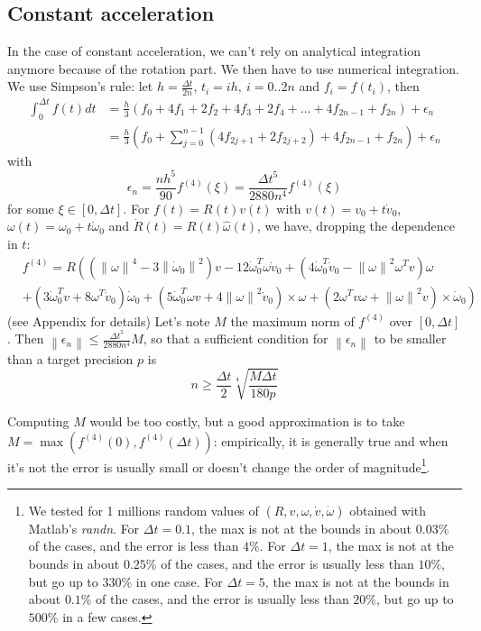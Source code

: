 \documentclass[]{article}
\newcommand{\norm}[1]{\left\| #1 \right\|}
\newcommand{\dt}{\Delta t}
\newcommand{\w}{\omega}
\newcommand{\dw}{\dot{\omega}}
\newcommand{\dv}{\dot{v}}
\begin{document}
\subsection{Constant acceleration}
In the case of constant acceleration, we can't rely on analytical integration anymore because of the rotation part. We then have to use numerical integration. We use Simpson's rule: let $h = \frac{\dt}{2n}$, $t_i = ih,\ i=0..2n$ and $f_i = f(t_i)$, then
\begin{align}
	\int_0^{\dt} f(t) dt &= \frac{h}{3}\left(f_0 + 4 f_1 + 2f_2 + 4 f_3 + 2 f_4 + \ldots + 4f_{2n-1} + f_{2n}\right) + \epsilon_n \\
	& = \frac{h}{3} \left(f_0 + \sum_{j=0}^{n-1} (4 f_{2j+1} + 2 f_{2j+2}) + 4f_{2n-1} + f_{2n}\right) + \epsilon_n
\end{align}
with
\begin{equation}
	\epsilon_n = \frac{nh^5}{90}f^{(4)}(\xi) = \frac{\dt^5}{2880n^4}f^{(4)}(\xi)
\end{equation}
for some $\xi \in \left[0,\dt\right]$.
\newline
For $f(t) = R(t)v(t)$ with $v(t) = v_0 + t \dv_0$, $\w(t) = \w_0 + t \dw_0$ and $\dot{R}(t) = R(t)\hat{\w}(t)$, we have, dropping the dependence in $t$:
\begin{align}
	&f^{(4)} = R \left((\norm{\w}^4-3\norm{\dw_0}^2)v -12\dw_0^T \w \dv_0 + (4\dw_0^T \dv_0 - \norm{\w}^2\w^T v)\w\right. \nonumber\\ 
	& \left. + (3\dw_0^T v + 8\w^T \dv_0)\dw_0+(5\dw_0^T \w v + 4\norm{\w}^2 \dv_0) \times \w + (2 \w^T v\w + \norm{\w}^2 v) \times \dw_0\right)\nonumber
\end{align}
(see Appendix for details)
\newline
Let's note $M$ the maximum norm of $f^{(4)}$ over $\left[0,\dt\right]$. Then $\norm{\epsilon_n} \leq \frac{\dt^5}{2880n^4}M$, so that a sufficient condition for $\norm{\epsilon_n}$ to be smaller than a target precision $p$ is
\begin{equation}
  n \geq \frac{\dt}{2} \sqrt[4]{\frac{M\dt}{180p}}
\end{equation}

Computing $M$ would be too costly, but a good approximation is to take $M = \max(f^{(4)}(0),f^{(4)}(\dt))$: empirically, it is generally true and when it's not the error is usually small or doesn't change the order of magnitude\footnote{We tested for 1 millions random values of $(R,v,\w,\dv,\dw)$ obtained with Matlab's \emph{randn}. For $\dt=0.1$, the max is not at the bounds in about $0.03\%$ of the cases, and the error is less than $4\%$. For $\dt=1$, the max is not at the bounds in about $0.25\%$ of the cases, and the error is usually less than $10\%$, but go up to $330\%$ in one case. For $\dt=5$, the max is not at the bounds in about $0.1\%$ of the cases, and the error is usually less than $20\%$, but go up to $500\%$ in a few cases.}.
\end{document}
